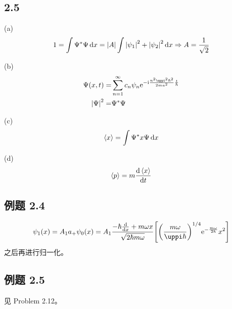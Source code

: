 \subsection{2.5}
\begin{framed}
    (a)
    \[
    1 = \int \Psi^* \Psi \dd{x} = \qty|A| \int \qty|\psi_1|^2 + \qty|\psi_2|^2 \dd{x} \Rightarrow A = \frac{1}{\sqrt{2}}
    \]

    (b)
    \begin{align*}
    \Psi(x, t) = & \sum_{n = 1}^{\infty} c_n \psi_n \rme^{- \rmi \frac{n^2 \uppi^2 \hbar^2}{2 m a^2} \frac{t}{\hbar}}\\
    \qty|\Psi|^2 = & \Psi^* \Psi 
    \end{align*}

    (c)
    \[
    \expval{x} = \int \Psi^* x \Psi \dd{x}
    \]

    (d)
    \[
    \expval{p} = m \dv{\expval{x}}{t}
    \]
\end{framed}

\subsection{例题 2.4}
\begin{framed}
    \[
    \psi_1(x) = A_1 a_+ \psi_0(x) = A_1 \frac{- \hbar \dv{x} + m \omega x}{\sqrt{2 \hbar m \omega}} \qty[\qty(\frac{m \omega}{\uppi \hbar})^{1 / 4} \rme^{- \frac{m \omega}{2 \hbar}} x^2]
    \] 之后再进行归一化。
\end{framed}

\subsection{例题 2.5}
\begin{framed}
    见 Problem 2.12。
\end{framed}


